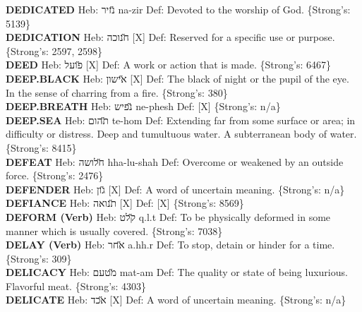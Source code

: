 {\textbf{DEDICATED} Heb: {\large\H נזיר} na-zir Def: Devoted to the worship of God. \{Strong's: 5139\}\hfill{}\\

\textbf{DEDICATION} Heb: {\large\H חנוכה} {[}X{]} Def: Reserved for a specific use or purpose. \{Strong's: 2597, 2598\}\hfill{}\\

\textbf{DEED} Heb: {\large\H פועל} {[}X{]} Def: A work or action that is made. \{Strong's: 6467\}\hfill{}\\

\textbf{DEEP.BLACK} Heb: {\large\H אישון} {[}X{]} Def: The black of night or the pupil of the eye. In the sense of charring from a fire. \{Strong's: 380\}\hfill{}\\

\textbf{DEEP.BREATH} Heb: {\large\H נפיש} ne-phesh Def: {[}X{]} \{Strong's: n/a\}\hfill{}\\

\textbf{DEEP.SEA} Heb: {\large\H תהום} te-hom Def: Extending far from some surface or area; in difficulty or distress. Deep and tumultuous water. A subterranean body of water. \{Strong's: 8415\}\hfill{}\\

\textbf{DEFEAT} Heb: {\large\H חלושה} hha-lu-shah Def: Overcome or weakened by an outside force. \{Strong's: 2476\}\hfill{}\\

\textbf{DEFENDER} Heb: {\large\H גון} {[}X{]} Def: A word of uncertain meaning. \{Strong's: n/a\}\hfill{}\\

\textbf{DEFIANCE} Heb: {\large\H תנואה} {[}X{]} Def: {[}X{]} \{Strong's: 8569\}\hfill{}\\

\textbf{DEFORM (Verb)} Heb: {\large\H קלט} q.l.t Def: To be physically deformed in some manner which is usually covered. \{Strong's: 7038\}\hfill{}\\

\textbf{DELAY (Verb)} Heb: {\large\H אחר} a.hh.r Def: To stop, detain or hinder for a time. \{Strong's: 309\}\hfill{}\\

\textbf{DELICACY} Heb: {\large\H מטעם} mat-am Def: The quality or state of being luxurious. Flavorful meat. \{Strong's: 4303\}\hfill{}\\

\textbf{DELICATE} Heb: {\large\H אכד} {[}X{]} Def: A word of uncertain meaning. \{Strong's: n/a\}\hfill{}\\

}
